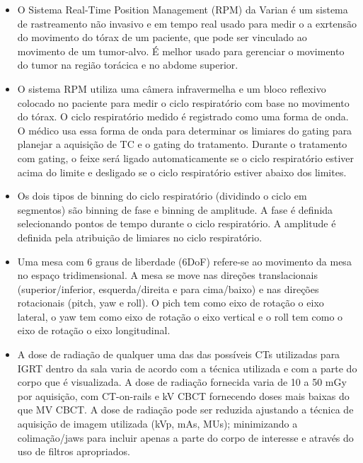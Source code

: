 \documentclass[11pt,a4paper]{article}
\newcounter{exemplo}
\begin{document}
\begin{exemplo}[IGRT]
\begin{itemize}
        \item O Sistema Real-Time Position Management (RPM) da Varian é um sistema de rastreamento não invasivo e em tempo real usado para medir o a exrtensão do movimento do tórax de um paciente, que pode ser vinculado ao movimento de um tumor-alvo. É melhor usado para gerenciar o movimento do tumor na região torácica e no abdome superior.
        
        \item O sistema RPM utiliza uma câmera infravermelha e um bloco reflexivo colocado no paciente para medir o ciclo respiratório com base no movimento do tórax. O ciclo respiratório medido é registrado como uma forma de onda. O médico usa essa forma de onda para determinar os limiares do gating para planejar a aquisição de TC e o gating do tratamento. Durante o tratamento com gating, o feixe será ligado automaticamente se o ciclo respiratório estiver acima do limite e desligado se o ciclo respiratório estiver abaixo dos limites.
        
        \item Os dois tipos de binning do ciclo respiratório (dividindo o ciclo em segmentos) são binning de fase e binning de amplitude. A fase é definida selecionando pontos de tempo durante o ciclo respiratório. A amplitude é definida pela atribuição de limiares no ciclo respiratório.
        
        \item Uma mesa com 6 graus de liberdade (6DoF) refere-se ao movimento da mesa no espaço tridimensional. A mesa se move nas direções translacionais (superior/inferior, esquerda/direita e para cima/baixo) e nas direções rotacionais (pitch, yaw e roll). O pich tem como eixo de rotação o eixo lateral, o yaw tem como eixo de rotação o eixo vertical e o roll tem como o eixo de rotação o eixo longitudinal.
        
        \item A dose de radiação de qualquer uma das das possíveis CTs utilizadas para IGRT dentro da sala varia de acordo com a técnica utilizada e com a parte do corpo que é visualizada. A dose de radiação fornecida varia de 10 a 50 mGy por aquisição, com CT-on-rails e kV CBCT fornecendo doses mais baixas do que MV CBCT. A dose de radiação pode ser reduzida ajustando a técnica de aquisição de imagem utilizada (kVp, mAs, MUs); minimizando a colimação/jaws para incluir apenas a parte do corpo de interesse e através do uso de filtros apropriados.
        

\end{itemize}
\end{exemplo}
\end{document}
